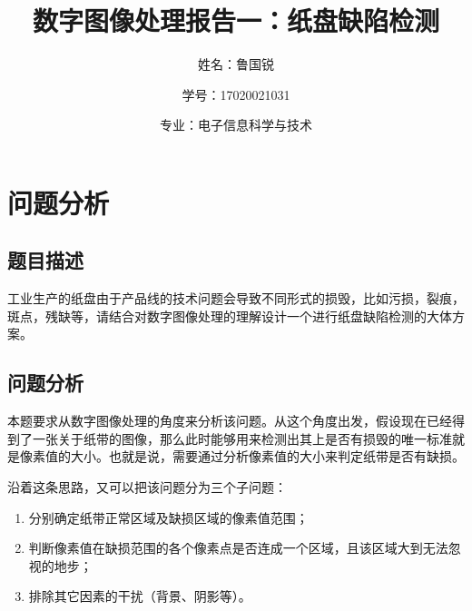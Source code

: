 \documentclass[UTF8]{ctexart}
\title{数字图像处理报告一：纸盘缺陷检测}
\author{姓名：鲁国锐 \protect\newline
\and 学号：17020021031 \\
\and 专业：电子信息科学与技术}
\begin{document}
	\maketitle
	\renewcommand{\contentsname}{Contents}
	\tableofcontents
	\newpage
	
	\hypersetup{
	bookmarks=true,
	colorlinks=true,
	linkcolor=red,
	urlcolor=blue
	}
	\section{问题分析}
	\subsection{题目描述}
	\indent 工业生产的纸盘由于产品线的技术问题会导致不同形式的损毁，比如污损，裂痕，斑点，残缺等，请结合对数字图像处理的理解设计一个进行纸盘缺陷检测的大体方案。

%     

	\subsection{问题分析}\label{analysis}
	\indent 本题要求从数字图像处理的角度来分析该问题。从这个角度出发，假设现在已经得到了一张关于纸带的图像，那么此时能够用来检测出其上是否有损毁的唯一标准就是像素值的大小。也就是说，需要通过分析像素值的大小来判定纸带是否有缺损。
	
	\indent 沿着这条思路，又可以把该问题分为三个子问题：
	\begin{enumerate}[leftmargin=50pt]
	\item 分别确定纸带正常区域及缺损区域的像素值范围；\label{problem1}
	\item 判断像素值在缺损范围的各个像素点是否连成一个区域，且该区域大到无法忽视的地步；\label{problem2}
	\item 排除其它因素的干扰（背景、阴影等）。\label{problem3}
	\end{enumerate}
	
\end{document}
